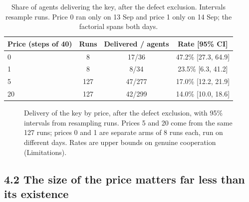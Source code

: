 \documentclass[11pt]{article}
\begin{document}
\begin{table}[htbp]
\centering
\small
\caption{Share of agents delivering the key, after the defect exclusion. Intervals resample runs.
Price 0 ran only on 13 Sep and price 1 only on 14 Sep; the factorial spans both days.}
\label{tab:rates}
\begin{tabular}{lccc}
\toprule
Price (steps of 40) & Runs & Delivered / agents & Rate [95\% CI] \\
\midrule
0  & 8   & 17/36  & 47.2\% [27.3, 64.9] \\
1  & 8   & 8/34   & 23.5\% [6.3, 41.2] \\
5  & 127 & 47/277 & 17.0\% [12.2, 21.9] \\
20 & 127 & 42/299 & 14.0\% [10.0, 18.6] \\
\bottomrule
\end{tabular}
\end{table}

\begin{figure}[htbp]
  \centering
  \caption{Delivery of the key by price, after the defect exclusion, with 95\% intervals from
  resampling runs. Prices 5 and 20 come from the same 127 runs; prices 0 and 1 are separate arms of
  8 runs each, run on different days. Rates are upper bounds on genuine cooperation (Limitations).}
  \label{fig:price}
\end{figure}

\subsection*{4.2 The size of the price matters far less than its existence}
\end{document}
